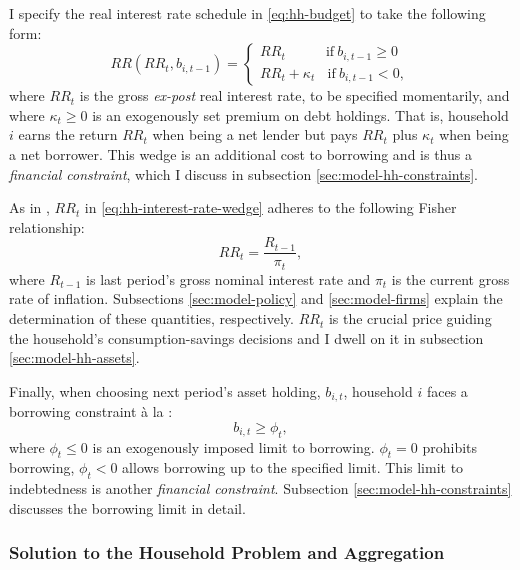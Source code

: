 \documentclass[a4paper,12pt]{article} %
\numberwithin{equation}{section} %
\numberwithin{figure}{section}
\numberwithin{table}{section}
\begin{document}
I specify the real interest rate schedule in \eqref{eq:hh-budget} to take the following form:
\begin{equation}
    RR (RR_t, b_{i,t-1}) = \begin{cases}
	RR_t \ \ \ \ \ \ \ \ \ \ \ \ \ \text{if} \ b_{i,t-1} \ge 0 \\
	RR_t + \kappa_t \ \ \ \ \text{if} \ b_{i,t-1} < 0,
	\end{cases} \label{eq:hh-interest-rate-wedge}
\end{equation}
where $RR_t$ is the gross \textit{ex-post} real interest rate, to be specified momentarily, and where $\kappa_t \ge 0$ is an exogenously set premium on debt holdings. That is, household $i$ earns the return $RR_t$ when being a net lender but pays $RR_t$ plus $\kappa_t$ when being a net borrower. This wedge is an additional cost to borrowing and is thus a \textit{financial constraint}, which I discuss in subsection \ref{sec:model-hh-constraints}.

As in \textcite{auclert2021}, $RR_t$ in \eqref{eq:hh-interest-rate-wedge} adheres to the following Fisher relationship:
\begin{equation}
    RR_t = \frac{R_{t-1}}{\pi_t}, \label{eq:hh-fisher-equation}
\end{equation}
where $R_{t-1}$ is last period's gross nominal interest rate and $\pi_t$ is the current gross rate of inflation. Subsections \ref{sec:model-policy} and \ref{sec:model-firms} explain the determination of these quantities, respectively. $RR_t$ is the crucial price guiding the household's consumption-savings decisions and I dwell on it in subsection \ref{sec:model-hh-assets}.

Finally, when choosing next period's asset holding, $b_{i,t}$, household $i$ faces a borrowing constraint à la \textcite{huggett1993}:
\begin{equation}
    b_{i,t} \ge \phi_t, \label{eq:borrowing-limit}
\end{equation}
where $\phi_t \le 0$ is an exogenously imposed limit to borrowing. $\phi_t = 0$ prohibits borrowing, $\phi_t < 0$ allows borrowing up to the specified limit. This limit to indebtedness is another \textit{financial constraint}. Subsection \ref{sec:model-hh-constraints} discusses the borrowing limit in detail.

\subsubsection{Solution to the Household Problem and Aggregation}
\label{sec:model-hh-solution}
\end{document}
